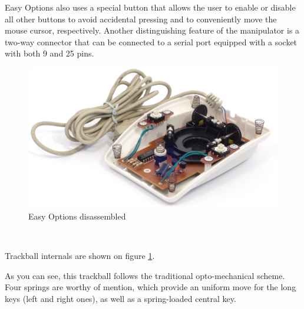 \documentclass[11pt, a4paper]{article}
\begin{document}
Easy Options also uses a special button that allows the user to enable or disable all other buttons to avoid accidental pressing and to conveniently move the mouse cursor, respectively. Another distinguishing feature of the manipulator is a two-way connector that can be connected to a serial port equipped with a socket with both 9 and 25 pins.

\begin{figure}[h]
    \centering
    \includegraphics[scale=0.6]{1993_easy_options_trackball/inside_60.jpg}
    \caption{Easy Options disassembled}
    \label{fig:EasyOptionsInside}
\end{figure}

~

Trackball internals are shown on figure \ref{fig:EasyOptionsInside}.

As you can see, this trackball follows the traditional opto-mechanical scheme. Four springs are worthy of mention, which provide an uniform move for the long keys (left and right ones), as well as a spring-loaded central key.
\end{document}
